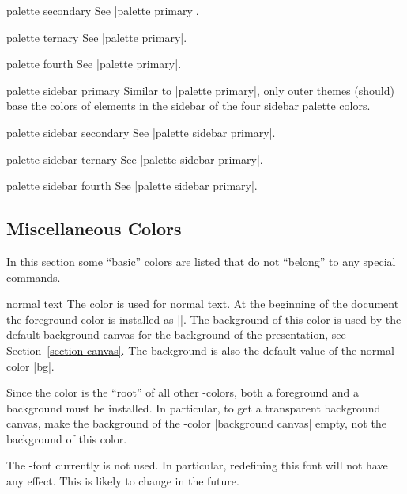 \begin{element}{palette secondary}\no\yes\no
  See |palette primary|.
\end{element}

\begin{element}{palette ternary}\no\yes\no
  See |palette primary|.
\end{element}

\begin{element}{palette fourth}\no\yes\no
  See |palette primary|.
\end{element}

\begin{element}{palette sidebar primary}\no\yes\no
  Similar to |palette primary|, only outer themes (should) base the
  colors of elements in the sidebar of the four sidebar palette
  colors.
\end{element}

\begin{element}{palette sidebar secondary}\no\yes\no
  See |palette sidebar primary|.
\end{element}

\begin{element}{palette sidebar ternary}\no\yes\no
  See |palette sidebar primary|.
\end{element}

\begin{element}{palette sidebar fourth}\no\yes\no
  See |palette sidebar primary|.
\end{element}



\subsection{Miscellaneous  Colors}

In this section some ``basic'' colors are listed that do not
``belong'' to any special commands. 

\begin{element}{normal text}\no\yes\yes
  The color is used for normal text. At the beginning of
  the document the foreground color is installed as
  |\normalcolor|. The background of this color is used by the
  default background canvas for the background of the
  presentation, see Section~\ref{section-canvas}. The background is
  also the default value of the normal color |bg|. 

  Since the color is the ``root'' of all other \beamer-colors, both a
  foreground and a background must be installed. In particular, to get
  a transparent background canvas, make the background of the
  \beamer-color |background canvas| empty, not the background of this
  color.

  The \beamer-font currently is not used. In particular, redefining this
  font will not have any effect. This is likely to change in the future.
\end{element}

